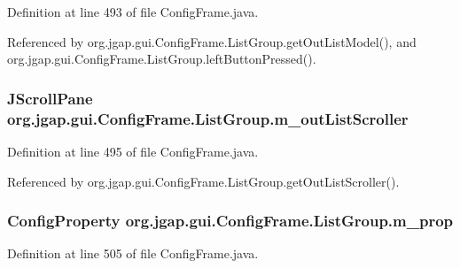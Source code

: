 Definition at line 493 of file Config\-Frame.\-java.



Referenced by org.\-jgap.\-gui.\-Config\-Frame.\-List\-Group.\-get\-Out\-List\-Model(), and org.\-jgap.\-gui.\-Config\-Frame.\-List\-Group.\-left\-Button\-Pressed().

\hypertarget{classorg_1_1jgap_1_1gui_1_1_config_frame_1_1_list_group_ae61ec42f592b7ecc88970b1718feecd9}{
\subsubsection[{m\-\_\-out\-List\-Scroller}]{\setlength{\rightskip}{0pt plus 5cm}J\-Scroll\-Pane org.\-jgap.\-gui.\-Config\-Frame.\-List\-Group.\-m\-\_\-out\-List\-Scroller\hspace{0.3cm}{\ttfamily [private]}}}\label{classorg_1_1jgap_1_1gui_1_1_config_frame_1_1_list_group_ae61ec42f592b7ecc88970b1718feecd9}


Definition at line 495 of file Config\-Frame.\-java.



Referenced by org.\-jgap.\-gui.\-Config\-Frame.\-List\-Group.\-get\-Out\-List\-Scroller().

\hypertarget{classorg_1_1jgap_1_1gui_1_1_config_frame_1_1_list_group_a7fe18a08d38e17673c341e54276ea688}{
\subsubsection[{m\-\_\-prop}]{\setlength{\rightskip}{0pt plus 5cm}Config\-Property org.\-jgap.\-gui.\-Config\-Frame.\-List\-Group.\-m\-\_\-prop\hspace{0.3cm}{\ttfamily [private]}}}\label{classorg_1_1jgap_1_1gui_1_1_config_frame_1_1_list_group_a7fe18a08d38e17673c341e54276ea688}


Definition at line 505 of file Config\-Frame.\-java.



